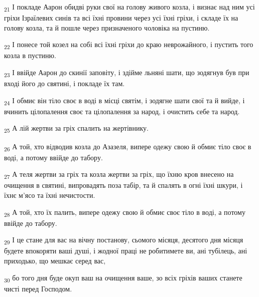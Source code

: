 \begin{tcolorbox}
\textsubscript{21} І покладе Аарон обидві руки свої на голову живого козла, і визнає над ним усі гріхи Ізраїлевих синів та всі їхні провини через усі їхні гріхи, і складе їх на голову козла, та й пошле через призначеного чоловіка на пустиню.
\end{tcolorbox}
\begin{tcolorbox}
\textsubscript{22} І понесе той козел на собі всі їхні гріхи до краю неврожайного, і пустить того козла в пустиню.
\end{tcolorbox}
\begin{tcolorbox}
\textsubscript{23} І ввійде Аарон до скинії заповіту, і здійме льняні шати, що зодягнув був при вході його до святині, і покладе їх там.
\end{tcolorbox}
\begin{tcolorbox}
\textsubscript{24} І обмиє він тіло своє в воді в місці святім, і зодягне шати свої та й вийде, і вчинить цілопалення своє та цілопалення за народ, і очистить себе та народ.
\end{tcolorbox}
\begin{tcolorbox}
\textsubscript{25} А лій жертви за гріх спалить на жертівнику.
\end{tcolorbox}
\begin{tcolorbox}
\textsubscript{26} А той, хто відводив козла до Азазеля, випере одежу свою й обмиє тіло своє в воді, а потому ввійде до табору.
\end{tcolorbox}
\begin{tcolorbox}
\textsubscript{27} А теля жертви за гріх та козла жертви за гріх, що їхню кров внесено на очищення в святині, випровадять поза табір, та й спалять в огні їхні шкури, і їхнє м'ясо та їхні нечистости.
\end{tcolorbox}
\begin{tcolorbox}
\textsubscript{28} А той, хто їх палить, випере одежу свою й обмиє своє тіло в воді, а потому ввійде до табору.
\end{tcolorbox}
\begin{tcolorbox}
\textsubscript{29} І це стане для вас на вічну постанову, сьомого місяця, десятого дня місяця будете впокоряти ваші душі, і жодної праці не робитимете ви, ані тубілець, ані приходько, що мешкає серед вас,
\end{tcolorbox}
\begin{tcolorbox}
\textsubscript{30} бо того дня буде окуп ваш на очищення ваше, зо всіх гріхів ваших станете чисті перед Господом.
\end{tcolorbox}
